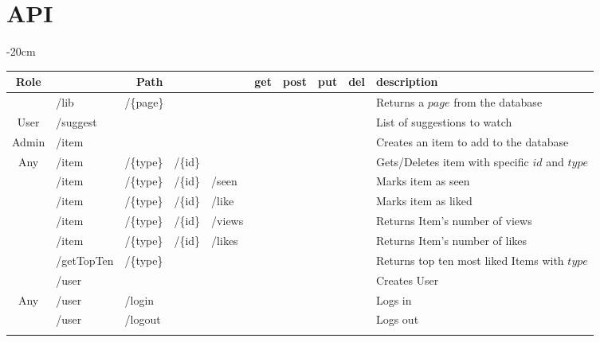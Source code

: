 \documentclass[oneside]{article}
\newcommand{\xmark}{\ding{53}} %
\begin{document}
\section{API}
\label{sec:api}
\begin{table}[H]
  \centering
  \addtolength{\leftskip} {-20cm}
  \addtolength{\rightskip}{-20cm}
  \begin{adjustbox}{width=1.4\textwidth}
  \begin{tabular}{ c|l l l l|c|c|c|c|l }
    \rowcolor{Gray}
    Role & \multicolumn{4}{c|}{Path} & get & post & put & del & description 
    \\ \hline
    & /lib & \multicolumn{3}{l|}{/\{page\}} &
    \xmark & & & &
    Returns a $page$ from the database
    \\
    \multirow{-2}{*}{User} & 
    \multicolumn{4}{l|}{/suggest} &
     & \xmark & & &
    List of suggestions to watch
    \\ \hhline{-|----|-|-|-|-|~} \rowcolor{Gray}
    Admin & /item & & & &
    & \xmark & & &
    Creates an item to add to the database
    \\ \hhline{-|----|-|-|-|-|~}
    Any &
    /item & /\{type\} & /\{id\} & &
    \xmark & & & \xmark &
    Gets/Deletes item with specific $id$ and $type$ 
    \\ \hhline{-|----|-|-|-|-|~} \rowcolor{Gray}
    & /item & /\{type\} & /\{id\} & /seen &
    & & \xmark & &
    Marks item as seen
    \\ \rowcolor{Gray}
    \multirow{-2}{*}{User}
    & /item & /\{type\} & /\{id\} & /like &
    & & \xmark & &
    Marks item as liked
    \\ \hhline{-|----|-|-|-|-|~}
    & /item & /\{type\} & /\{id\} & /views &
    \xmark & & & &
    Returns Item's number of views
    \\
    & /item & /\{type\} & /\{id\} & /likes &
    \xmark & & & &
    Returns Item's number of likes
    \\ 
    & /getTopTen & /\{type\} &  &  &
    \xmark & & & &
    Returns top ten most liked Items with $type$
    \\ 
    & \multicolumn{4}{l|}{/user} &
    & \xmark & & &
    Creates User
    \\
    \multirow{-5}{*}{Any} 
    & /user & \multicolumn{3}{l|}{/login} &
    \xmark & & & &
    Logs in
    \\ \hhline{-|----|-|-|-|-|~} \rowcolor{Gray}
    & /user & \multicolumn{3}{l|}{/logout} &
    \xmark & & & &
    Logs out
    \\ \rowcolor{Gray}

\end{tabular}
\end{adjustbox}
\end{table}
\end{document}
